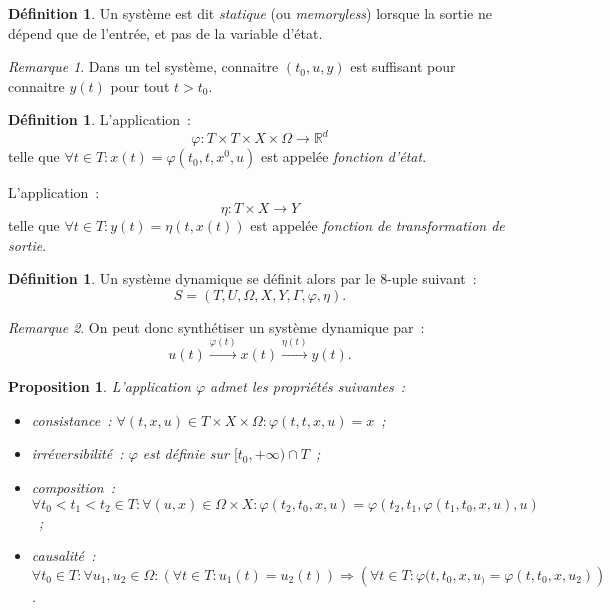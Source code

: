 \documentclass{article}
\newtheorem{prp}[thm]{Proposition}
\theoremstyle{definition}
\newtheorem{déf}[thm]{Définition}
\theoremstyle{remark}
\newtheorem*{rmq}{Remarque}
\newcommand{\R}{\mathbb R}
\begin{document}
	\begin{déf} Un système est dit \textit{statique} (ou \textit{memoryless}) lorsque la sortie ne dépend que de l'entrée, et pas de la variable d'état.
	\end{déf}

	\begin{rmq} Dans un tel système, connaitre $(t_0, u, y)$ est suffisant pour connaitre $y(t)$ pour tout $t > t_0$.
	\end{rmq}

	\begin{déf} L'application~:
	\[\varphi : T \times T \times X \times \Omega \to \R^d\]
	telle que $\forall t \in T : x(t) = \varphi(t_0, t, x^0, u)$ est appelée \textit{fonction d'état}.

	L'application~:
	\[\eta : T \times X \to Y\]
	telle que $\forall t \in T : y(t) = \eta(t, x(t))$ est appelée \textit{fonction de transformation de sortie}.
	\end{déf}

	\begin{déf} Un système dynamique se définit alors par le 8-uple suivant~:
	\[S = \left(T, U, \Omega, X, Y, \Gamma, \varphi, \eta\right).\]
	\end{déf}

	\begin{rmq} On peut donc synthétiser un système dynamique par~:
	\[u(t) \xrightarrow{\varphi(t)} x(t) \xrightarrow{\eta(t)} y(t).\]
	\end{rmq}

	\begin{prp} L'application $\varphi$ admet les propriétés suivantes~:
	\begin{itemize}
		\item consistance~: $\forall (t, x, u) \in T \times X \times \Omega : \varphi(t, t, x, u) = x$~;
		\item irréversibilité~: $\varphi$ est définie sur $[t_0, +\infty) \cap T$~;
		\item composition~: $\forall t_0 < t_1 < t_2 \in T : \forall (u, x) \in \Omega \times X : \varphi(t_2, t_0, x, u)
			= \varphi\left(t_2, t_1, \varphi\left(t_1, t_0, x, u\right), u\right)$~;
		\item causalité~: $\forall t_0 \in T : \forall u_1, u_2 \in \Omega : \left(\forall t \in T : u_1(t) = u_2(t)\right)
			\Rightarrow \left(\forall t \in T : \varphi(t, t_0, x, u_) = \varphi(t, t_0, x, u_2)\right)$.
	\end{itemize}
	\end{prp}
\end{document}
